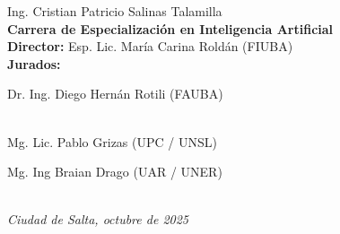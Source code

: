 \begin{titlepage}
\begin{flushright}
        {\fontsize{20pt}{25pt}\selectfont
        Ing. Cristian Patricio Salinas Talamilla} \\[1cm]

        {\fontsize{15pt}{20pt}\selectfont
        \textbf{Carrera de Especialización en Inteligencia Artificial}
        } \\[2cm]

        {\fontsize{11pt}{15pt}\selectfont
        \textbf{Director:} Esp. Lic. María Carina Roldán (FIUBA)} \\[1cm]

        {\fontsize{11pt}{15pt}\selectfont
        \textbf{Jurados:}} \\[0.5cm]
        {\fontsize{11pt}{15pt}\selectfont
        

Dr. Ing. Diego Hernán Rotili (FAUBA)} \\ 
        {\fontsize{11pt}{15pt}\selectfont
        Mg. Lic. Pablo Grizas (UPC / UNSL)} \\ 
        {\fontsize{11pt}{15pt}\selectfont
        

Mg. Ing Braian Drago (UAR / UNER)} \\[2cm]

        {\itshape\fontsize{10pt}{12pt}\selectfont
        Ciudad de Salta, octubre de 2025} %
    \end{flushright}
\end{titlepage}
